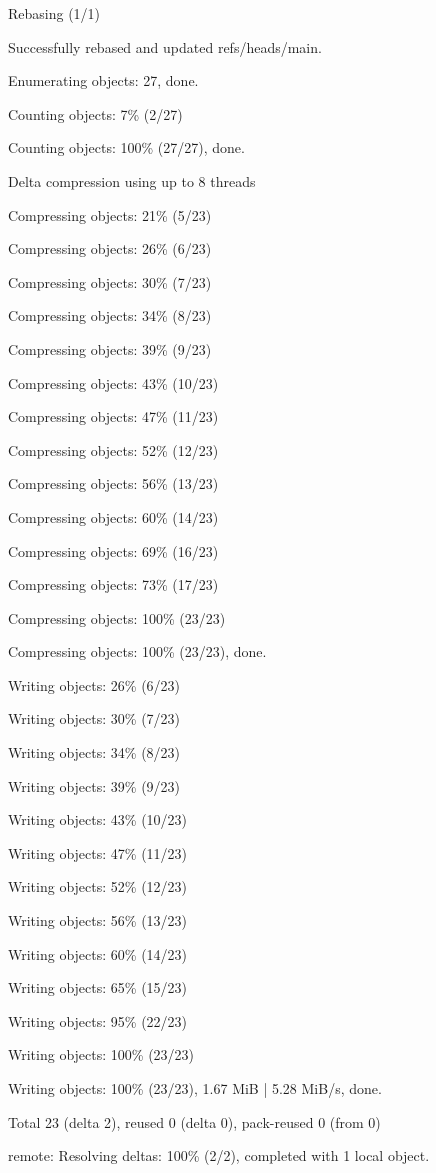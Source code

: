 \documentclass[11pt,a4paper]{article}
\begin{document}
{\begin{itemize}
Rebasing (1/1)

Successfully rebased and updated refs/heads/main.

Enumerating objects: 27, done.

Counting objects:   7\% (2/27)

Counting objects: 100\% (27/27), done.

Delta compression using up to 8 threads

Compressing objects:  21\% (5/23)

Compressing objects:  26\% (6/23)

Compressing objects:  30\% (7/23)

Compressing objects:  34\% (8/23)

Compressing objects:  39\% (9/23)

Compressing objects:  43\% (10/23)

Compressing objects:  47\% (11/23)

Compressing objects:  52\% (12/23)

Compressing objects:  56\% (13/23)

Compressing objects:  60\% (14/23)

Compressing objects:  69\% (16/23)

Compressing objects:  73\% (17/23)

Compressing objects: 100\% (23/23)

Compressing objects: 100\% (23/23), done.

Writing objects:  26\% (6/23)

Writing objects:  30\% (7/23)

Writing objects:  34\% (8/23)

Writing objects:  39\% (9/23)

Writing objects:  43\% (10/23)

Writing objects:  47\% (11/23)

Writing objects:  52\% (12/23)

Writing objects:  56\% (13/23)

Writing objects:  60\% (14/23)

Writing objects:  65\% (15/23)

Writing objects:  95\% (22/23)

Writing objects: 100\% (23/23)

Writing objects: 100\% (23/23), 1.67 MiB | 5.28 MiB/s, done.

Total 23 (delta 2), reused 0 (delta 0), pack-reused 0 (from 0)

remote: Resolving deltas: 100\% (2/2), completed with 1 local object.


\end{itemize}}
\end{document}
